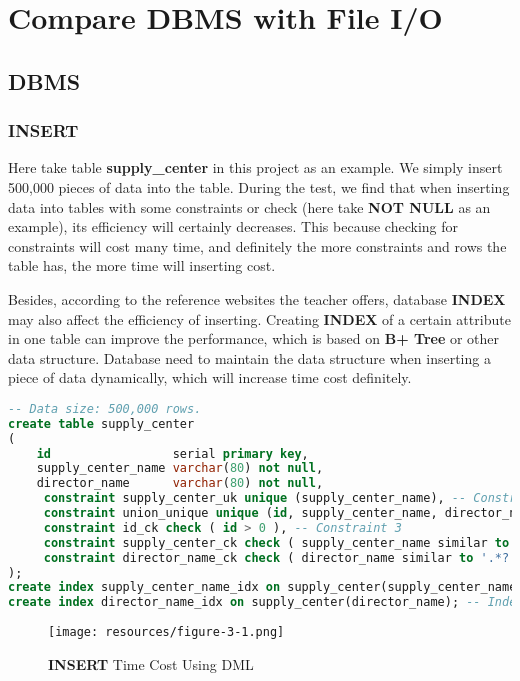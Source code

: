\documentclass[onecolumn, oneside, ctexart, UTF8, b4paper]{SUSTechHomework}
\begin{document}
\section{Compare DBMS with File I/O}
\subsection{\textbf{DBMS}}
\subsubsection{\textbf{INSERT}}
Here take table \textbf{supply\_center} in this project as an example. We simply insert 500,000 pieces of data into the table. During the test, we find that when inserting data into tables with some constraints or check (here take \textbf{NOT NULL} as an example), its efficiency will certainly decreases. This because checking for constraints will cost many time, and definitely the more constraints and rows the table has, the more time will inserting cost.

Besides, according to the reference websites the teacher offers, database \textbf{INDEX} may also affect the efficiency of inserting. Creating \textbf{INDEX} of a certain attribute in one table can improve the performance, which is based on \textbf{B+ Tree} or other data structure. Database need to maintain the data structure when inserting a piece of data dynamically, which will increase time cost definitely.

\begin{lstlisting}[language=SQL]
-- Data size: 500,000 rows.
create table supply_center
(
    id                 serial primary key,
    supply_center_name varchar(80) not null,
    director_name      varchar(80) not null,
     constraint supply_center_uk unique (supply_center_name), -- Constraint 1
     constraint union_unique unique (id, supply_center_name, director_name), -- Constraint 2
     constraint id_ck check ( id > 0 ), -- Constraint 3
     constraint supply_center_ck check ( supply_center_name similar to '.*?'), -- Constraint 4
     constraint director_name_ck check ( director_name similar to '.*?') -- Constraint 5
);
create index supply_center_name_idx on supply_center(supply_center_name); -- Index 1
create index director_name_idx on supply_center(director_name); -- Index 2
\end{lstlisting}

\begin{figure}[htbp]
    \centering
    \texttt{[image: resources/figure-3-1.png]}
    \caption{\textbf{INSERT} Time Cost Using DML}
    \label{fig2}
\end{figure}
\end{document}
